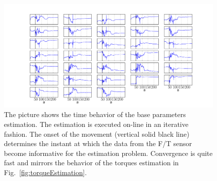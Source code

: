 \begin{figure}
 \centering
 \includegraphics[width=1\textwidth]{images/param_identification.pdf}
 \caption{The picture shows the time behavior of the base parameters estimation. The estimation is executed on-line in an iterative fashion. The onset of the movement (vertical solid black line) determines the instant at which the data from the F/T sensor become informative for the estimation problem. Convergence is quite fast and mirrors the behavior of the torques estimation in Fig.~\ref{fig:torqueEstimation}.}
 \label{fig:paramEstimation}
\end{figure}



